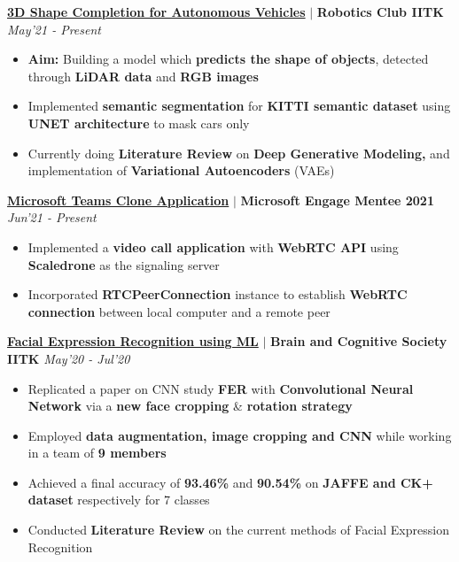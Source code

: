 \documentclass[9pt]{extarticle}
\begin{document}
\vspace{-1mm}

\hspace{-2mm}\textbf{\href{https://github.com/Lakshita2002/3D-Shape-Completion-for-Autonomous-Vehicles}{3D Shape Completion for Autonomous Vehicles}} $|$ \textbf{Robotics Club IITK}
\hfill\hfill\textit{May'21 - Present}\\
\vspace{-4mm}
\begin{itemize}
\item  \textbf{Aim:} Building a model which \textbf{predicts the shape of objects}, detected through \textbf{LiDAR data} and \textbf{RGB images} 
\item  Implemented \textbf{semantic segmentation} for \textbf{KITTI semantic dataset} using \textbf{UNET architecture} to mask cars only
\item Currently doing \textbf{Literature Review} on \textbf{Deep Generative Modeling,} and implementation of \textbf{Variational Autoencoders} (VAEs)
\end{itemize}
\vspace{2.5mm}

\hspace{-2mm}\textbf{\href{https://github.com/Lakshita2002/clone}{Microsoft Teams Clone Application}} $|$ \textbf{Microsoft Engage Mentee 2021}
\hfill\hfill\textit{Jun'21 - Present}\\
\vspace{-4mm}
\begin{itemize}
\item  Implemented a \textbf{video call application} with \textbf{WebRTC API} using \textbf{Scaledrone} as the signaling server
\item Incorporated \textbf{RTCPeerConnection} instance to establish \textbf{WebRTC connection} between local computer and a remote peer
\end{itemize}
\vspace{2.5mm}

\hspace{-2mm}\textbf{\href{https://github.com/Lakshita2002/FER_brain_and_cognitive_society}{Facial Expression Recognition using ML}} $|$ \textbf{Brain and Cognitive Society IITK}
\hfill\hfill\textit{May'20 - Jul'20}\\
\vspace{-4mm}
\begin{itemize}
\item  Replicated a paper on CNN study \textbf{FER} with \textbf{Convolutional Neural Network} via a \textbf{new face cropping} \& \textbf{rotation strategy}
\item  Employed \textbf{data augmentation, image cropping and CNN} while working in a team of \textbf{9 members}
\item  Achieved a final accuracy of \textbf{93.46\%} and \textbf{90.54\%} on \textbf{JAFFE and CK+ dataset} respectively for 7 classes
\item Conducted \textbf{Literature Review} on the current methods of Facial Expression Recognition
\end{itemize}
\vspace{-1mm}
\end{document}
